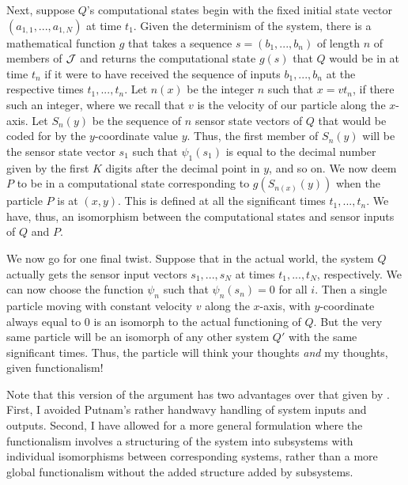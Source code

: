Next, suppose $Q$'s computational states begin with the fixed initial state vector $(a_{1,1},...,a_{1,N})$ at time $t_1$. Given 
the determinism of the system, there is a mathematical function $g$ that takes a sequence $s=(b_1,...,b_n)$ of length $n$ of members of $\mathcal J$ 
and returns the computational state $g(s)$ that $Q$ would be in at time $t_n$ if it were to have received the sequence of inputs $b_1,...,b_n$ 
at the respective times $t_1,...,t_n$. Let $n(x)$ be the integer $n$ such that $x=v t_n$, if there such an integer, where we recall that
$v$ is the velocity of our particle along the $x$-axis. Let $S_n(y)$ be the sequence of $n$ sensor state vectors of $Q$ that would be coded for by the $y$-coordinate value $y$. Thus, the first member of $S_n(y)$ will be the sensor state vector
$s_1$ such that $\psi_1(s_1)$ is equal to the decimal number given by the first $K$ digits after the decimal point in $y$, and so on.
We now deem $P$ to be in a computational state corresponding to $g(S_{n(x)}(y))$ when the particle $P$ is at $(x,y)$. This is defined at all the
significant times $t_1,...,t_n$. We have, thus, an isomorphism between the computational states and sensor inputs of $Q$ and $P$.

We now go for one final twist. Suppose that in the actual world, the
system $Q$ actually gets the sensor input vectors $s_1,...,s_N$ at times $t_1,...,t_N$, respectively. We can now choose the 
function $\psi_n$ such that $\psi_n(s_n)=0$ for all $i$. Then a single particle moving with constant velocity 
$v$ along the $x$-axis, with $y$-coordinate always equal to $0$ is an isomorph to the actual functioning of $Q$.
But the very same particle will be an isomorph of any other system $Q'$ with the same significant times. Thus,
the particle will think your thoughts \textit{and} my thoughts, given functionalism!

Note that this version of the argument has two advantages over that given by . First,
I avoided Putnam's rather handwavy handling of system inputs and outputs. Second, I have allowed for a
more general formulation where the functionalism involves a structuring of the system into subsystems
with individual isomorphisms between corresponding systems, rather than a more global functionalism
without the added structure added by subsystems. 

\chaptertail 


